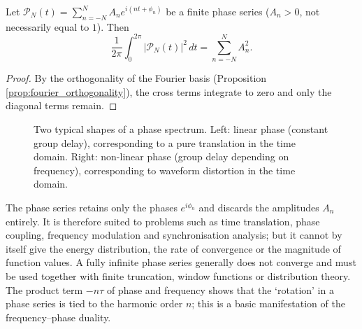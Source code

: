 \begin{property}\label{prop:phase_parseval_finite}
Let $\mathcal{P}_N(t) = \sum_{n=-N}^{N} A_n e^{i(nt+\phi_n)}$ be a finite phase series ($A_n > 0$, not necessarily equal to $1$). Then
\[
\frac{1}{2\pi}\int_0^{2\pi} |\mathcal{P}_N(t)|^2\,dt = \sum_{n=-N}^{N} A_n^2.
\]
\end{property}

\begin{proof}
By the orthogonality of the Fourier basis (Proposition \ref{prop:fourier_orthogonality}), the cross terms integrate to zero and only the diagonal terms remain.
\end{proof}

\begin{figure}[htbp]
\centering
{}
\caption{Two typical shapes of a phase spectrum. Left: linear phase (constant group delay), corresponding to a pure translation in the time domain. Right: non-linear phase (group delay depending on frequency), corresponding to waveform distortion in the time domain.}
\label{fig:phase_spectrum_examples}
\end{figure}

\begin{remark}\label{rem:phase_series_scope}
The phase series retains only the phases $e^{i\phi_n}$ and discards the amplitudes $A_n$ entirely. It is therefore suited to problems such as time translation, phase coupling, frequency modulation and synchronisation analysis; but it cannot by itself give the energy distribution, the rate of convergence or the magnitude of function values. A fully infinite phase series generally does not converge and must be used together with finite truncation, window functions or distribution theory. The product term $-n\tau$ of phase and frequency shows that the `rotation' in a phase series is tied to the harmonic order $n$; this is a basic manifestation of the frequency--phase duality.
\end{remark}


